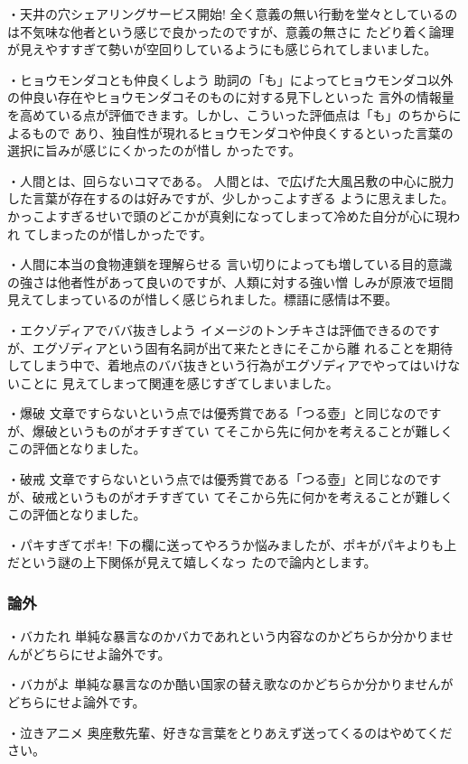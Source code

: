 ・天井の穴シェアリングサービス開始!
全く意義の無い行動を堂々としているのは不気味な他者という感じで良かったのですが、意義の無さに
たどり着く論理が見えやすすぎて勢いが空回りしているようにも感じられてしまいました。

・ヒョウモンダコとも仲良くしよう
助詞の「も」によってヒョウモンダコ以外の仲良い存在やヒョウモンダコそのものに対する見下しといった
言外の情報量を高めている点が評価できます。しかし、こういった評価点は「も」のちからによるもので
あり、独自性が現れるヒョウモンダコや仲良くするといった言葉の選択に旨みが感じにくかったのが惜し
かったです。

・人間とは、回らないコマである。
人間とは、で広げた大風呂敷の中心に脱力した言葉が存在するのは好みですが、少しかっこよすぎる
ように思えました。かっこよすぎるせいで頭のどこかが真剣になってしまって冷めた自分が心に現われ
てしまったのが惜しかったです。

・人間に本当の食物連鎖を理解らせる
言い切りによっても増している目的意識の強さは他者性があって良いのですが、人類に対する強い憎
しみが原液で垣間見えてしまっているのが惜しく感じられました。標語に感情は不要。

・エクゾディアでババ抜きしよう
イメージのトンチキさは評価できるのですが、エグゾディアという固有名詞が出て来たときにそこから離
れることを期待してしまう中で、着地点のババ抜きという行為がエグゾディアでやってはいけないことに
見えてしまって関連を感じすぎてしまいました。

・爆破
文章ですらないという点では優秀賞である「つる壺」と同じなのですが、爆破というものがオチすぎてい
てそこから先に何かを考えることが難しくこの評価となりました。

・破戒
文章ですらないという点では優秀賞である「つる壺」と同じなのですが、破戒というものがオチすぎてい
てそこから先に何かを考えることが難しくこの評価となりました。

・パキすぎてポキ!
下の欄に送ってやろうか悩みましたが、ポキがパキよりも上だという謎の上下関係が見えて嬉しくなっ
たので論内とします。

\subsubsection{論外}

・バカたれ
単純な暴言なのかバカであれという内容なのかどちらか分かりませんがどちらにせよ論外です。

・バカがよ
単純な暴言なのか酷い国家の替え歌なのかどちらか分かりませんがどちらにせよ論外です。

・泣きアニメ
奥座敷先輩、好きな言葉をとりあえず送ってくるのはやめてください。

